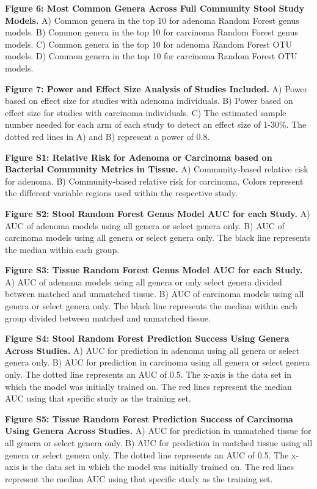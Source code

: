 \documentclass[12pt,]{article}
\begin{document}
\textbf{Figure 6: Most Common Genera Across Full Community Stool Study
Models.} A) Common genera in the top 10 for adenoma Random Forest genus
models. B) Common genera in the top 10 for carcinoma Random Forest genus
models. C) Common genera in the top 10 for adenoma Random Forest OTU
models. D) Common genera in the top 10 for carcinoma Random Forest OTU
models.

\textbf{Figure 7: Power and Effect Size Analysis of Studies Included.}
A) Power based on effect size for studies with adenoma individuals. B)
Power based on effect size for studies with carcinoma individuals. C)
The estimated sample number needed for each arm of each study to detect
an effect size of 1-30\%. The dotted red lines in A) and B) represent a
power of 0.8.

\newpage

\textbf{Figure S1: Relative Risk for Adenoma or Carcinoma based on
Bacterial Community Metrics in Tissue.} A) Community-based relative risk
for adenoma. B) Community-based relative risk for carcinoma. Colors
represent the different variable regions used within the respective
study.

\textbf{Figure S2: Stool Random Forest Genus Model AUC for each Study.}
A) AUC of adenoma models using all genera or select genera only. B) AUC
of carcinoma models using all genera or select genera only. The black
line represents the median within each group.

\textbf{Figure S3: Tissue Random Forest Genus Model AUC for each Study.}
A) AUC of adenoma models using all genera or only select genera divided
between matched and unmatched tissue. B) AUC of carcinoma models using
all genera or select genera only. The black line represents the median
within each group divided between matched and unmatched tissue.

\textbf{Figure S4: Stool Random Forest Prediction Success Using Genera
Across Studies.} A) AUC for prediction in adenoma using all genera or
select genera only. B) AUC for prediction in carcinoma using all genera
or select genera only. The dotted line represents an AUC of 0.5. The
x-axis is the data set in which the model was initially trained on. The
red lines represent the median AUC using that specific study as the
training set.

\textbf{Figure S5: Tissue Random Forest Prediction Success of Carcinoma
Using Genera Across Studies.} A) AUC for prediction in unmatched tissue
for all genera or select genera only. B) AUC for prediction in matched
tissue using all genera or select genera only. The dotted line
represents an AUC of 0.5. The x-axis is the data set in which the model
was initially trained on. The red lines represent the median AUC using
that specific study as the training set.
\end{document}
